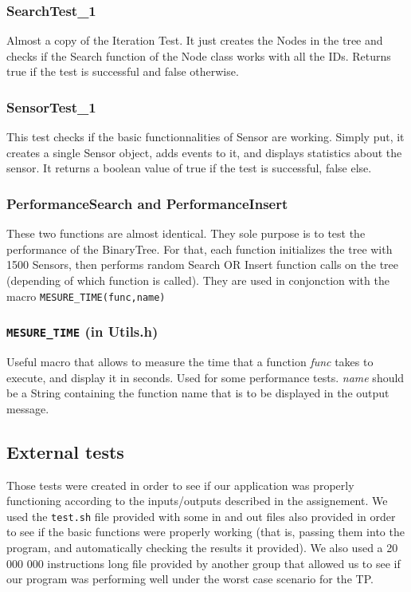 \documentclass[10pt]{article}
\begin{document}
\subsubsection{SearchTest\_1}
Almost a copy of the Iteration Test. It just creates the Nodes in the tree and checks if the Search function of the Node class works with all the IDs. Returns true if the test is successful and false otherwise.

\subsubsection{SensorTest\_1}
This test checks if the basic functionnalities of Sensor are working. Simply put, it creates a single Sensor object, adds events to it, and displays statistics about the sensor. It returns a boolean value of true if the test is successful, false else.

\subsubsection{PerformanceSearch and PerformanceInsert}
These two functions are almost identical. They sole purpose is to test the performance of the BinaryTree. For that, each function initializes the tree with 1500 Sensors, then performs random Search OR Insert function calls on the tree (depending of which function is called). They are used in conjonction with the macro \texttt{MESURE\_TIME(func,name)}

\subsubsection{\texttt{MESURE\_TIME} (in Utils.h)}
Useful macro that allows to measure the time that a function \emph{func} takes to execute, and display it in seconds. Used for some performance tests. \emph{name} should be a String containing the function name that is to be displayed in the output message.

\subsection{External tests}
Those tests were created in order to see if our application was properly functioning according to the inputs/outputs described in the assignement. We used the \texttt{test.sh} file provided with some in and out files also provided in order to see if the basic functions were properly working (that is, passing them into the program, and automatically checking the results it provided). We also used a 20 000 000 instructions long file provided by another group that allowed us to see if our program was performing well under the worst case scenario for the TP.
\end{document}
